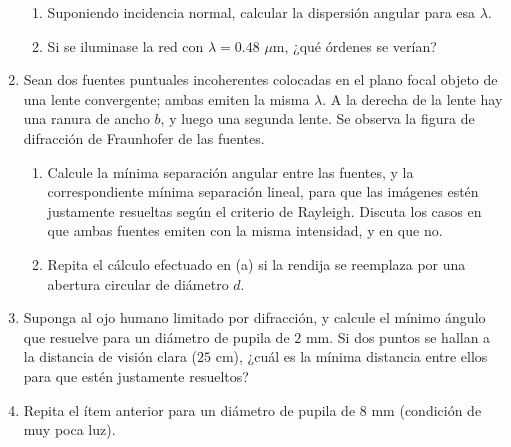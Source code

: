 \documentclass[11pt,spanish]{article}
\begin{document}
\begin{enumerate}
\begin{enumerate}
        \item Suponiendo incidencia normal, calcular la dispersión angular para
        esa $\lambda$.

        \item Si se iluminase la red con $\lambda=0.48$ $\mu$m, ¿qué órdenes se
        verían?
    \end{enumerate}


    \item Sean dos fuentes puntuales incoherentes colocadas en el plano focal
    objeto de una lente convergente; ambas emiten la misma $\lambda$.
    A la derecha de la lente hay una ranura de ancho $b$, y luego una
    segunda lente. Se observa la figura de difracción de Fraunhofer de
    las fuentes.

    \begin{enumerate}
        \item Calcule la mínima separación angular entre las fuentes, y la correspondiente
        mínima separación lineal, para que las imágenes estén justamente resueltas
        según el criterio de Rayleigh. Discuta los casos en que ambas fuentes
        emiten con la misma intensidad, y en que no.

        \item Repita el cálculo efectuado en (a) si la rendija se reemplaza por
        una abertura circular de diámetro $d$.
    \end{enumerate}


    \item Suponga al ojo humano limitado por difracción, y calcule el mínimo
    ángulo que resuelve para un diámetro de pupila de $2$ mm. Si dos puntos
    se hallan a la distancia de visión clara ($25$ cm), ¿cuál es la mínima distancia
    entre ellos para que estén justamente resueltos?

    
    \item Repita el ítem anterior para un diámetro de pupila de $8$ mm
    (condición de muy poca luz).

\end{enumerate}
\end{document}
